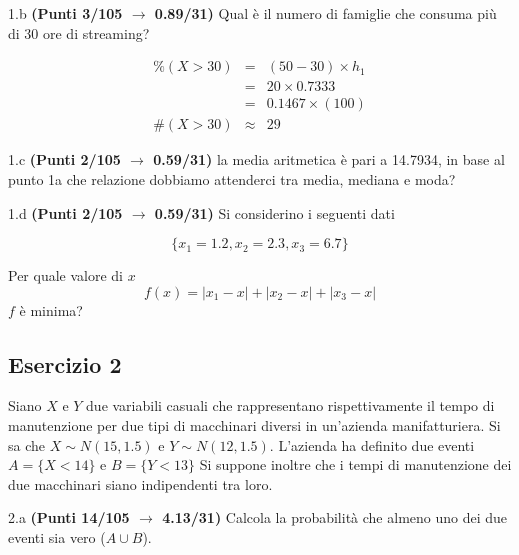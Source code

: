 \documentclass[
  11pt,
]{book}
\theoremstyle{mytheoremstyle}
\theoremstyle{mydefstyle}
\newenvironment{sol}
  {
  \begin{tcolorbox}[enhanced,breakable,arc=0.1mm,boxrule=1pt,colback=white,colframe=iblue,
  title=\bf \fontfamily{lmss}\selectfont \hspace{.5 cm} Soluzione,drop fuzzy shadow]

}{
\end{tcolorbox}
  }
\begin{document}
1.b \textbf{(Punti 3/105 \(\rightarrow\) 0.89/31)} Qual è il numero di famiglie che consuma più di 30 ore di streaming?

\begin{sol}
\begin{eqnarray*}
     \%(X> 30 ) &=&( 50 - 30 )\times h_1 \\
              &=& 20 \times  0.7333 \\
              &=&  0.1467 \times(100)\\
     \#(X> 30 ) &\approx& 29 
         \end{eqnarray*}

\end{sol}

1.c \textbf{(Punti 2/105 \(\rightarrow\) 0.59/31)} la media aritmetica è pari a 14.7934, in base al punto 1a che relazione dobbiamo attenderci tra media, mediana e moda?

1.d \textbf{(Punti 2/105 \(\rightarrow\) 0.59/31)} Si considerino i seguenti dati

\[
\{x_1=1.2,x_2=2.3,x_3=6.7\}
\]

Per quale valore di \(x\)
\[
f(x)=|x_1-x|+|x_2-x|+|x_3-x|
\]
\(f\) è minima?

\subsection{Esercizio 2}\label{esercizio-2-32}

Siano \(X\) e \(Y\) due variabili casuali che rappresentano rispettivamente il tempo di manutenzione per due tipi di macchinari diversi in un'azienda manifatturiera. Si sa che \(X\sim N(15,1.5)\) e \(Y\sim N(12,1.5)\). L'azienda ha definito due eventi \(A=\{X< 14\}\) e \(B=\{Y<13\}\)
Si suppone inoltre che i tempi di manutenzione dei due macchinari siano indipendenti tra loro.

2.a \textbf{(Punti 14/105 \(\rightarrow\) 4.13/31)} Calcola la probabilità che almeno uno dei due eventi sia vero (\(A \cup B\)).
\end{document}
